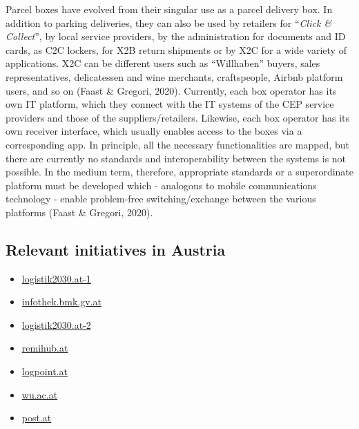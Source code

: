 \documentclass[
]{book}
\providecommand{\tightlist}{%
  \setlength{\itemsep}{0pt}\setlength{\parskip}{0pt}}
\begin{document}
Parcel boxes have evolved from their singular use as a parcel delivery box. In addition to parking deliveries, they can also be used by retailers for ``\emph{Click \& Collect}'', by local service providers, by the administration for documents and ID cards, as C2C lockers, for X2B return shipments or by X2C for a wide variety of applications. X2C can be different users such as ``Willhaben'' buyers, sales representatives, delicatessen and wine merchants, craftspeople, Airbnb platform users, and so on (Faast \& Gregori, 2020). Currently, each box operator has its own IT platform, which they connect with the IT systems of the CEP service providers and those of the suppliers/retailers. Likewise, each box operator has its own receiver interface, which usually enables access to the boxes via a corresponding app. In principle, all the necessary functionalities are mapped, but there are currently no standards and interoperability between the systems is not possible. In the medium term, therefore, appropriate standards or a superordinate platform must be developed which - analogous to mobile communications technology - enable problem-free switching/exchange between the various platforms (Faast \& Gregori, 2020).

\hypertarget{relevant-initiatives-in-austria-30}{%
\subsection*{Relevant initiatives in Austria}\label{relevant-initiatives-in-austria-30}}

\begin{itemize}
\tightlist
\item
  \href{https://www.logistik2030.at/?page_id=268}{logistik2030.at-1}
\item
  \href{https://infothek.bmk.gv.at/gruene-stadtlogistik-post-testet-city-hubs-in-wien/}{infothek.bmk.gv.at}
\item
  \href{https://www.logistik2030.at/?page_id=63}{logistik2030.at-2}
\item
  \href{https://www.remihub.at}{remihub.at}
\item
  \href{https://logpoint.at/ueber-uns/gruene-logistikwelt-und-standorte/}{logpoint.at}
\item
  \href{https://www.wu.ac.at/scm/projekte/}{wu.ac.at}
\item
  \href{https://www.post.at/p/c/vorzimmer-zustellung}{post.at}
\end{itemize}
\end{document}
